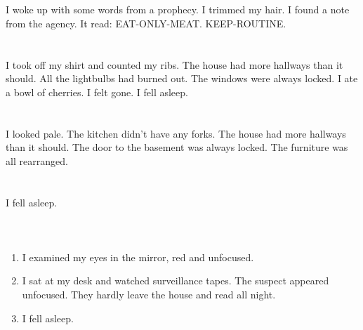 \documentclass{article}
\begin{document}
    \section{}
    I woke up with some words from a prophecy. I trimmed my hair. I found a note from the agency. It read: EAT-ONLY-MEAT. KEEP-ROUTINE.  
    \newpage
    
    \section{}
    I took off my shirt and counted my ribs. The house had more hallways than it should. All the lightbulbs had burned out. The windows were always locked. I ate a bowl of cherries. I felt gone. I fell asleep.  
    \newpage
    
    \section{}
    I looked pale. The kitchen didn't have any forks. The house had more hallways than it should. The door to the basement was always locked. The furniture was all rearranged.  
    \newpage
    
    \section{}
    I fell asleep.\\\\ 
    \newpage
    
    \section{}
    
    \begin{enumerate}
    
    \item I examined my eyes in the mirror, red and unfocused.\\
    
    \item I sat at my desk and watched surveillance tapes. The suspect appeared unfocused. They hardly leave the house and read all night.\\
    
    \item I fell asleep.\\
    
    \end{enumerate}
     
\end{document}
